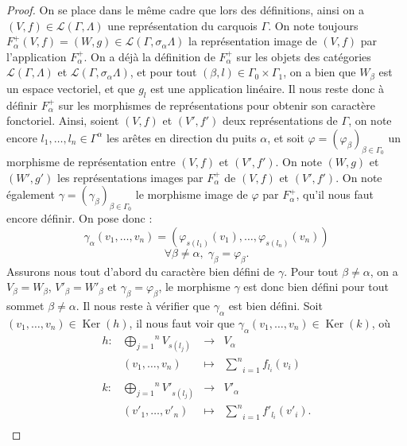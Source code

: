 \documentclass[a4paper,10pt]{article}
\DeclareMathOperator{\Ker}{Ker}
\begin{document}
\begin{proof}
	On se place dans le même cadre que lors des définitions, ainsi on a $(V,f)\in\mathscr{L}(\Gamma,\Lambda)$ une représentation du carquois $\Gamma$. On note toujours $F_{\alpha}^{+}(V,f)=(W,g)\in\mathscr{L}(\Gamma,\sigma_{\alpha}\Lambda)$ la représentation image de $(V,f)$ par l'application $F_{\alpha}^{+}$. On a déjà la définition de $F_{\alpha}^{+}$ sur les objets des catégories $\mathscr{L}(\Gamma,\Lambda)$ et $\mathscr{L}(\Gamma,\sigma_{\alpha}\Lambda)$, et pour tout $(\beta,l)\in\Gamma_{0}\times\Gamma_{1}$, on a bien que $W_{\beta}$ est un espace vectoriel, et que $g_{l}$ est une application linéaire. Il nous reste donc à définir $F_{\alpha}^{+}$ sur les morphismes de représentations pour obtenir son caractère fonctoriel. Ainsi, soient $(V,f)$ et $(V',f')$ deux représentations de $\Gamma$, on note encore $l_{1},\dots,l_{n}\in\Gamma^{\alpha}$ les arêtes en direction du puits $\alpha$, et soit $\varphi=(\varphi_{\beta})_{\beta\in\Gamma_{0}}$ un morphisme de représentation entre $(V,f)$ et $(V',f')$. On note $(W,g)$ et $(W',g')$ les représentations images par $F_{\alpha}^{+}$ de $(V,f)$ et $(V',f')$. On note également $\gamma=(\gamma_{\beta})_{\beta\in\Gamma_{0}}$ le morphisme image de $\varphi$ par $F_{\alpha}^{+}$, qu'il nous faut encore définir. On pose donc :
	\[	
		\gamma_{\alpha}(v_{1},\dots,v_{n})=(\varphi_{s(l_{1})}(v_{1}),\dots,\varphi_{s(l_{n})}(v_{n}))
	\]
	\[
		\forall \beta\neq\alpha,\; \gamma_{\beta}=\varphi_{\beta}.
	\]
	Assurons nous tout d'abord du caractère bien défini de $\gamma$. Pour tout $\beta\neq\alpha$, on a $V_{\beta}=W_{\beta}$, $V'_{\beta}=W'_{\beta}$ et $\gamma_{\beta}=\varphi_{\beta}$, le morphisme $\gamma$ est donc bien défini pour tout sommet $\beta\neq\alpha$. Il nous reste à vérifier que $\gamma_{\alpha}$ est bien défini. Soit $(v_{1},\dots,v_{n})\in\Ker(h)$, il nous faut voir que $\gamma_{\alpha}(v_{1},\dots,v_{n})\in\Ker(k)$, où
	\[
\begin{array}{lccc}
	h : & \overset{n}{\underset{j=1}{\bigoplus}}V_{s(l_{j})}&\rightarrow & V_{\alpha} \\ 
	& (v_{1},\dots,v_{n})&\mapsto & \underset{i=1}{\overset{n}{\sum}}f_{l_{i}}(v_{i})\\
	&&&\\
	k : & \overset{n}{\underset{j=1}{\bigoplus}}V'_{s(l_{j})}&\rightarrow & V'_{\alpha} \\ 
	& (v'_{1},\dots,v'_{n})&\mapsto & \underset{i=1}{\overset{n}{\sum}}f'_{l_{i}}(v'_{i}).\\
\end{array}
\]
\end{proof}
\end{document}

